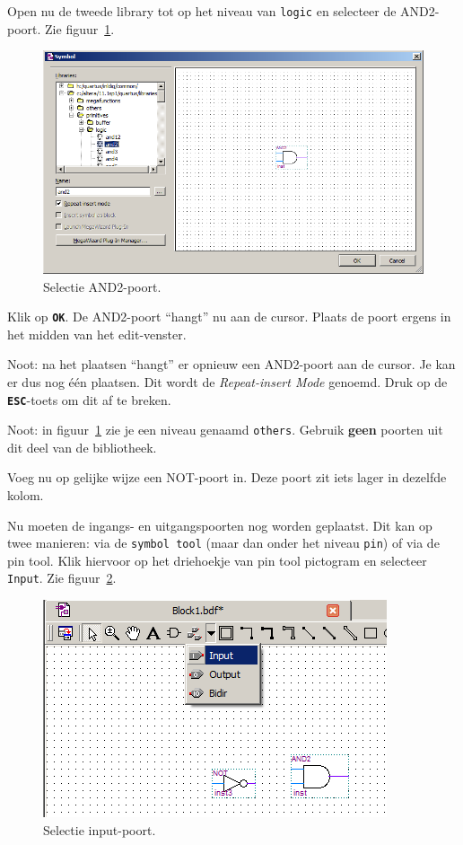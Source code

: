 \documentclass[a4paper,12pt,fleqn,twoside]{book}
\def\tutpicscale{0.455}
\newcommand{\knop}[1]{\texttt{\textbf{#1}}}
\newcommand{\naam}[1]{\texttt{#1}}
\begin{document}
Open nu de tweede library tot op het niveau van \naam{logic} en selecteer
de AND2-poort. Zie figuur~\ref{fig:023withandport}.

\begin{figure}[H]
\centering
\includegraphics[scale=\tutpicscale]{023withandport}
\caption{Selectie AND2-poort.}
\label{fig:023withandport}
\end{figure}

Klik op \knop{OK}. De AND2-poort ``hangt'' nu aan de cursor. Plaats de poort
ergens in het midden van het edit-venster. 

Noot: na het plaatsen ``hangt'' er opnieuw een AND2-poort aan de cursor. Je
kan er dus nog \'{e}\'{e}n plaatsen. Dit wordt de \textsl{Repeat-insert Mode}
genoemd. Druk op de \knop{ESC}-toets om dit af te breken.

Noot: in figuur~\ref{fig:023withandport} zie je een niveau genaamd
\naam{others}. Gebruik \textbf{geen} poorten uit dit deel van de bibliotheek.
 
Voeg nu op gelijke wijze een NOT-poort in. Deze poort zit iets lager in
dezelfde kolom. 
 
Nu moeten de ingangs- en uitgangspoorten nog worden geplaatst. Dit kan op twee
manieren: via de \naam{symbol tool} (maar dan onder het niveau \naam{pin})
of via de pin tool. Klik hiervoor op het driehoekje van pin tool
pictogram en selecteer \naam{Input}. Zie figuur~\ref{fig:025selectinput}.

\begin{figure}[H]
\centering
\includegraphics[scale=\tutpicscale]{025selectinput}
\caption{Selectie input-poort.}
\label{fig:025selectinput}
\end{figure}
\end{document}
